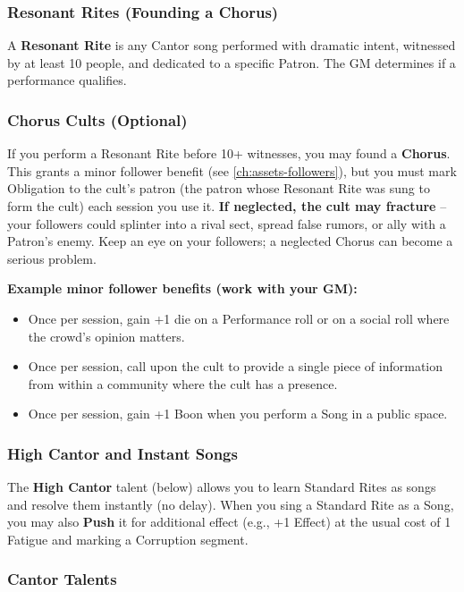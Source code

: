 \subsubsection*{Resonant Rites (Founding a Chorus)}
\label{sec:resonant-rite}
A \textbf{Resonant Rite} is any Cantor song performed with dramatic intent, witnessed by at least 10 people, and dedicated to a specific Patron. The GM determines if a performance qualifies.

\subsubsection*{Chorus Cults (Optional)}
\label{sec:chorus-cults}
If you perform a Resonant Rite before 10+ witnesses, you may found a \textbf{Chorus}. This grants a minor follower benefit (see \ref{ch:assets-followers}), but you must mark Obligation to the cult's patron (the patron whose Resonant Rite was sung to form the cult) each session you use it. \textbf{If neglected, the cult may fracture} -- your followers could splinter into a rival sect, spread false rumors, or ally with a Patron's enemy. Keep an eye on your followers; a neglected Chorus can become a serious problem.

\textbf{Example minor follower benefits (work with your GM):}
\begin{itemize}
  \item Once per session, gain +1 die on a Performance roll or on a social roll where the crowd's opinion matters.
  \item Once per session, call upon the cult to provide a single piece of information from within a community where the cult has a presence.
  \item Once per session, gain +1 Boon when you perform a Song in a public space.
\end{itemize}

\subsubsection*{High Cantor and Instant Songs}
\label{sec:high-cantor}
The \textbf{High Cantor} talent (below) allows you to learn Standard Rites as songs and resolve them instantly (no delay). When you sing a Standard Rite as a Song, you may also \textbf{Push} it for additional effect (e.g., +1 Effect) at the usual cost of 1 Fatigue and marking a Corruption segment.

\subsubsection*{Cantor Talents}
\label{sec:cantor-talents}

